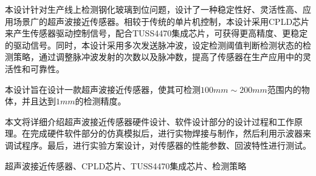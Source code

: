 \begin{ZhAbstract}
    本设计针对生产线上检测钢化玻璃到位问题，设计了一种稳定性好、灵活性高、应用场景广的超声波接近传感器。相较于传统的单片机控制，本设计采用CPLD芯片来产生传感器驱动控制信号，配合TUSS4470集成芯片，可获得更高精度、更稳定的驱动信号。同时，本设计采用多次发送脉冲波，设定检测阈值判断检测状态的检测策略，通过调整脉冲波发射的次数以及脉冲数，提高了传感器在生产应用中的灵活性和可靠性。\par
    本设计旨在设计一款超声波接近传感器，使其可检测$100mm\sim200mm$范围内的物体，并且达到$1mm$的检测精度。
    
    本文将详细介绍超声波接近传感器硬件设计、软件设计部分的设计过程和工作原理。在完成硬件软件部分的仿真模拟后，进行实物焊接与制作，然后利用示波器来调试程序。最后，进行实验方案设计，对传感器的性能参数、回波特性进行测试。    
    
    \ChineseKeyWord 超声波接近传感器、CPLD芯片、TUSS4470集成芯片、检测策略
    
\end{ZhAbstract}